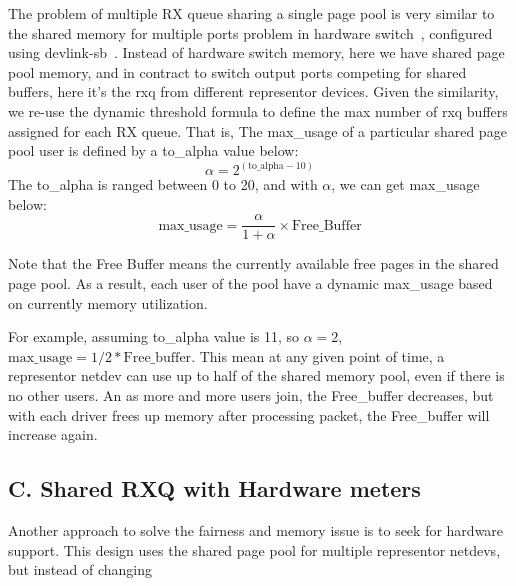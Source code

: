 \documentclass[letterpaper]{article}
\begin{document}
The problem of multiple RX queue sharing a single page pool is
very similar to the shared memory for multiple ports problem in
hardware switch~\cite{}, configured using devlink-sb~\cite{devlinksb}.
Instead of hardware switch memory, here we have shared page pool memory,
and in contract to switch output ports competing for shared buffers,
here it's the rxq from different representor devices.
Given the similarity, we re-use the dynamic threshold formula to define
the max number of rxq buffers assigned for each RX queue. That is,
The max\_usage of a particular shared page pool user is
defined by a to\_alpha value below:
\begin{equation}
\alpha = 2^{(\text{to\_alpha} - 10)}
\end{equation}
The to\_alpha is ranged between 0 to 20, and with $\alpha$, we can get
max\_usage below:
\begin{equation}
\text{max\_usage} = \frac{\alpha}{1 + \alpha} \times \text{Free\_Buffer}
\end{equation}

Note that the Free Buffer means the currently available free pages
in the shared page pool. As a result, each user of the pool have a
dynamic max\_usage based on currently memory utilization.

For example, assuming to\_alpha value is 11, so $\alpha = 2$, $ \text{max\_usage}
= 1/2 * \text{Free\_buffer} $.
This mean at any given point of time, a representor netdev can use up to half of
the shared memory pool, even if there is no other users. An as more and more
users join, the Free\_buffer decreases, but with each driver frees up memory
after processing packet, the Free\_buffer will increase again.

\subsection{C. Shared RXQ with Hardware meters}
Another approach to solve the fairness and memory issue is to seek for hardware
support. This design uses the shared page pool for multiple representor netdevs,
but instead of changing 
\end{document}
